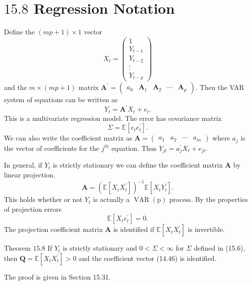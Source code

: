 \documentclass[10pt]{article}
\begin{document}
\section{$15.8$ Regression Notation}
Define the $(m p+1) \times 1$ vector
$$
X_{t}=\left(\begin{array}{c}
1 \\
Y_{t-1} \\
Y_{t-2} \\
\vdots \\
Y_{t-p}
\end{array}\right)
$$
and the $m \times(m p+1)$ matrix $\boldsymbol{A}^{\prime}=\left(\begin{array}{lllll}a_{0} & \boldsymbol{A}_{1} & \boldsymbol{A}_{2} & \cdots & \boldsymbol{A}_{p}\end{array}\right)$. Then the VAR system of equations can be written as
$$
Y_{t}=\boldsymbol{A}^{\prime} X_{t}+e_{t} .
$$
This is a multivariate regression model. The error has covariance matrix
$$
\Sigma=\mathbb{E}\left[e_{t} e_{t}^{\prime}\right] .
$$
We can also write the coefficient matrix as $\boldsymbol{A}=\left(\begin{array}{llll}a_{1} & a_{2} & \cdots & a_{m}\end{array}\right)$ where $a_{j}$ is the vector of coefficients for the $j^{t h}$ equation. Thus $Y_{j t}=a_{j}^{\prime} X_{t}+e_{j t}$.

In general, if $Y_{t}$ is strictly stationary we can define the coefficient matrix $\boldsymbol{A}$ by linear projection.
$$
\boldsymbol{A}=\left(\mathbb{E}\left[X_{t} X_{t}^{\prime}\right]\right)^{-1} \mathbb{E}\left[X_{t} Y_{t}^{\prime}\right] .
$$
This holds whether or not $Y_{t}$ is actually a $\operatorname{VAR}(\mathrm{p})$ process. By the properties of projection errors
$$
\mathbb{E}\left[X_{t} e_{t}^{\prime}\right]=0 .
$$
The projection coefficient matrix $\boldsymbol{A}$ is identified if $\mathbb{E}\left[X_{t} X_{t}^{\prime}\right]$ is invertible.

Theorem $15.8$ If $Y_{t}$ is strictly stationary and $0<\Sigma<\infty$ for $\Sigma$ defined in (15.6), then $\boldsymbol{Q}=\mathbb{E}\left[X_{t} X_{t}^{\prime}\right]>0$ and the coefficient vector (14.46) is identified.

The proof is given in Section 15.31.
\end{document}
